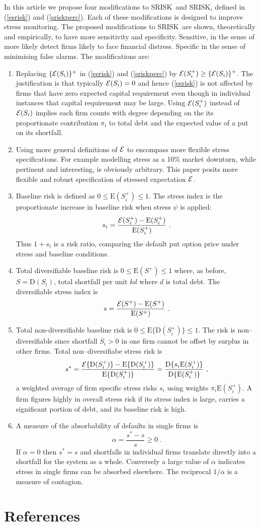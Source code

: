 \documentclass[authoryear]{elsarticle}
\newcommand{\E}{\mathrm{E}}
\newcommand{\Ex}{{\cal E}}
\newcommand{\Es}{\Ex}
\newcommand{\sr}{\ensuremath{\mathrm{SRISK}}}
\newcommand{\eref}[1]{(\ref{#1})}
\newcommand{\D}{\mathrm{D}}
\begin{document}
In this article we propose four modifications to \sr\ and $\sr_i$ defined in \eref{esrisk} and \eref{sriskperc}.   Each of these modifications is designed to improve stress monitoring.  The proposed  modifications to \sr\  are shown,  theoretically and empirically, to have more  sensitivity and specificity.   Sensitive, in the sense of more likely detect  firms likely to face financial distress.   Specific in the sense of   minimising false alarms.  The modifications are:
\begin{enumerate}
\item  Replacing $\{\Es(S_i)\} ^+$ in \eref{esrisk} and \eref{sriskperc} by $\Es(S_i^+)\ge\{\Es(S_i)\} ^+$.   The justification is that typically $\Es(S_i)=0$ and  hence \eref{esrisk} is not affected by firms that  have zero expected capital requirement even though in individual instances that capital requirement may be large.   Using $\Ex(S^+_i)$ instead of $\Ex(S_i)$ implies each firm counts with degree depending on the its proportionate contribution $\pi_i$ to total debt and the expected value of a put on its shortfall.   
\item Using more general   definitions of $\Es$ to encompass more flexible stress specifications.   For example modelling stress  as a 10\% market downturn, while pertinent and interesting, is obviously arbitrary.   This paper posits more flexible and robust specification of stressed expectation $\Ex$.   
\item  Baseline risk is defined as $0\le \E(S_i^+)\le 1$.  The  stress index  is the proportionate increase in baseline risk when stress $\psi$ is applied:
$$
s_i=\frac{\Ex(S_i^+)-\E(S_i^+)}{\E(S_i^+)}\ .
$$
Thus $1+s_i$ is a risk ratio, comparing the default put option price under stress and baseline conditions.
\item Total diversifiable baseline risk is $0\le\E(S^+)\le 1$ where, as before, $S=\D(S_i)$, total shortfall per unit $kd$ where $d$ is total debt.  The diversifiable stress index is 
$$
s=\frac{\Ex(S^+)-\E(S^+)}{\E(S^+)}\ .
$$

\item Total non-diversifiable baseline risk is $0\le\E\{\D(S_i^+)\}\le 1$.  The risk is non--diversifiable since shortfall $S_i>0$ in one firm cannot be offset by surplus in other firms.   Total non--diversifiabe  stress risk is
$$
s^*=\frac{\Ex\{\D(S_i^+)\}-\E\{\D(S_i^+)\}}{\E\{\D(S_i^+)\}} = \frac{\D\{s_i\E(S^+_i)\}}{\D\{\E(S^+_i)\}}\ ,
$$
a weighted average of firm specific stress risks $s_i$ using weights $\pi_i\E(S_i^+)$.   A firm figures highly in overall stress risk if its stress index is large, carries a significant portion of debt,  and its baseline risk is high.   


\item  A measure of the absorbability of defaults in single firms is 
$$
 \alpha= \frac{s^*-s}{s}\ge 0\ .
$$
If $\alpha=0$ then $s^*= s$ and  shortfalls in individual firms translate  directly into a shortfall for the system as a whole.   Conversely a large value of $\alpha$ indicates stress in single firms can be absorbed elsewhere.   The reciprocal $1/\alpha$ is a measure of contagion.
\end{enumerate}

\section*{References}

\end{document}
